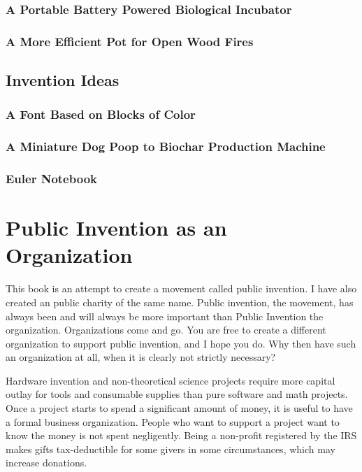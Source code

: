 \documentclass[
	fontsize=10pt, %
	twoside=false, %
	secnumdepth=1, %
]{kaobook}
\begin{document}
\subsection{A Portable Battery Powered Biological Incubator}

\subsection{A More Efficient Pot for Open Wood Fires}

\section{Invention Ideas}

\subsection{A Font Based on Blocks of Color}

\subsection{A Miniature Dog Poop to Biochar Production Machine}

\subsection{Euler Notebook}




\chapter{Public Invention as an Organization}


This book is an attempt to create a movement called public invention.
I have also created an public charity of the same name.
Public invention, the movement, has always been and will always be more important than Public Invention the organization.
Organizations come and go.
You are free to create a different organization to support public invention, and I hope you do.
Why then have such an organization at all, when it is clearly not strictly necessary?

Hardware invention and non-theoretical science projects require more capital outlay
for tools and consumable supplies than pure software and math projects.
Once a project starts to spend a significant amount of money, it is useful to have a formal business organization.
People who want to support a project want to know the money is not spent negligently.
Being a non-profit registered by the IRS makes gifts tax-deductible for some givers in some circumstances,
which may increase donations.
\end{document}
